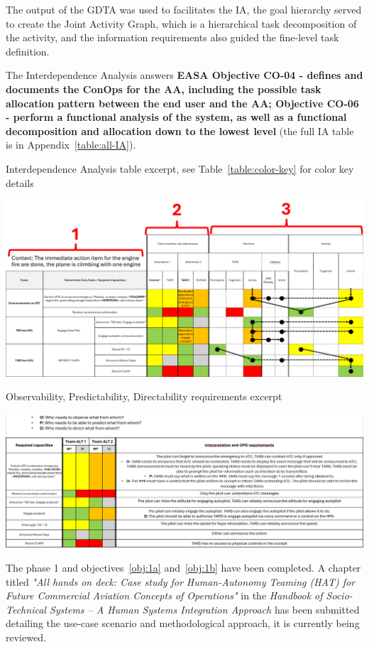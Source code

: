 \documentclass[12pt,a4paper]{article} %
\begin{document}
	The output of the GDTA was used to facilitates the IA, the goal hierarchy served to create the Joint Activity Graph, which is a hierarchical task decomposition of the activity, and the information requirements also guided the fine-level task definition. 
	
	The Interdependence Analysis answers \textbf{EASA Objective CO-04 - defines and documents the ConOps for the AA, including the possible task allocation pattern between the end user and the AA; Objective CO-06 - perform a functional analysis of the system, as well as a functional decomposition and allocation down to the lowest level} (the full IA table is in Appendix~\ref{table:all-IA}).
	
	\begin{table}[H]
		\centering
		\caption{Interdependence Analysis table excerpt, see Table~\ref{table:color-key} for color key details}
		\includegraphics[width=1\textwidth]{images/IA-table.png}
		\label{table:IA}
	\end{table}

	\begin{table}[H]
		\centering
		\caption{Observability, Predictability, Directability requirements excerpt}
		\includegraphics[width=1\textwidth]{images/OPD_table.png}
		\label{table:OPD}
	\end{table}

	The phase 1 and objectives~\ref{obj:1a} and~\ref{obj:1b} have been completed. A chapter titled \textit{"All hands on deck: Case study for Human-Autonomy Teaming (HAT) for Future Commercial Aviation Concepts of Operations"} in the \textit{Handbook of Socio-Technical Systems -- A Human Systems Integration Approach} has been submitted detailing the use-case scenario and methodological approach, it is currently being reviewed.
\end{document}
